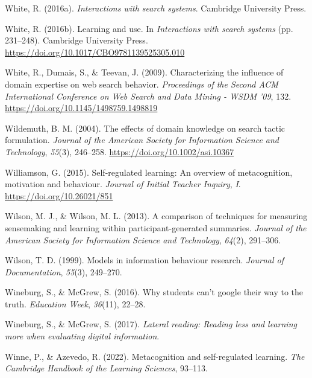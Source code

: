 \documentclass[letterpaper, nobind]{templates/ociamthesis}
\newlength{\cslhangindent}
\newenvironment{CSLReferences}[2] %
 {%
  \setlength{\parindent}{0pt}
  \ifodd #1
  \let\oldpar\par
  \def\par{\hangindent=\cslhangindent\oldpar}
  \fi
  \setlength{\parskip}{1mm}
  \setlength{\baselineskip}{6mm}
 }%
 {}
\begin{document}
\begin{CSLReferences}{1}{0}
\leavevmode{}%
White, R. (2016a). \emph{Interactions with search systems}. Cambridge University Press.

\leavevmode{}%
White, R. (2016b). Learning and use. In \emph{Interactions with search systems} (pp. 231--248). {Cambridge University Press}. \url{https://doi.org/10.1017/CBO9781139525305.010}

\leavevmode{}%
White, R., Dumais, S., \& Teevan, J. (2009). Characterizing the influence of domain expertise on web search behavior. \emph{Proceedings of the {Second ACM International Conference} on {Web Search} and {Data Mining} - {WSDM} '09}, 132. \url{https://doi.org/10.1145/1498759.1498819}

\leavevmode{}%
Wildemuth, B. M. (2004). The effects of domain knowledge on search tactic formulation. \emph{Journal of the American Society for Information Science and Technology}, \emph{55}(3), 246--258. \url{https://doi.org/10.1002/asi.10367}

\leavevmode{}%
Williamson, G. (2015). Self-regulated learning: An overview of metacognition, motivation and behaviour. \emph{Journal of Initial Teacher Inquiry}, \emph{I}. \url{https://doi.org/10.26021/851}

\leavevmode{}%
Wilson, M. J., \& Wilson, M. L. (2013). A comparison of techniques for measuring sensemaking and learning within participant-generated summaries. \emph{Journal of the American Society for Information Science and Technology}, \emph{64}(2), 291--306.

\leavevmode{}%
Wilson, T. D. (1999). Models in information behaviour research. \emph{Journal of Documentation}, \emph{55}(3), 249--270.

\leavevmode{}%
Wineburg, S., \& McGrew, S. (2016). Why students can't google their way to the truth. \emph{Education Week}, \emph{36}(11), 22--28.

\leavevmode{}%
Wineburg, S., \& McGrew, S. (2017). \emph{Lateral reading: Reading less and learning more when evaluating digital information}.

\leavevmode{}%
Winne, P., \& Azevedo, R. (2022). Metacognition and self-regulated learning. \emph{The Cambridge Handbook of the Learning Sciences}, 93--113.


\end{CSLReferences}
\end{document}
